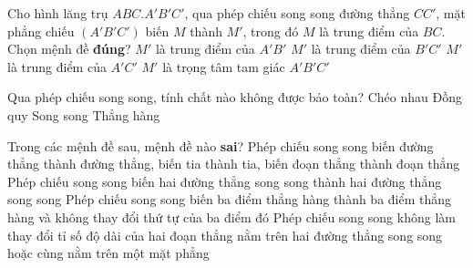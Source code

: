 

\begin{ex}%
	Cho hình lăng trụ $ABC.A'B'C'$, qua phép chiếu song song đường thẳng $CC'$, mặt phẳng  chiếu $(A'B'C')$ biến $M$ thành $M'$, trong đó $M$ là trung điểm của $BC$. Chọn mệnh đề \textbf{đúng}?
	\choice 
		{$M'$ là trung điểm của  $A'B'$}
		{\True $M'$ là trung điểm của  $B'C'$}
		{$M'$ là trung  điểm của $A'C'$}
		{$M'$ là  trọng tâm tam giác $A'B'C'$}
\end{ex}

\begin{ex}%
	Qua phép chiếu song song, tính chất nào không  được bảo toàn?
	\choice 
		{\True Chéo nhau} 
		{Đồng quy} 
		{Song song} 
		 {Thẳng hàng}
\end{ex}

\begin{ex}%
	Trong các mệnh đề sau, mệnh đề nào \textbf{sai}? 
	\choice 
		{Phép chiếu song song biến đường thẳng thành đường thẳng, biến tia thành tia,  biến đoạn thẳng thành đoạn thẳng}
		{\True Phép chiếu song song biến  hai đường thẳng song song thành hai đường thẳng song song}
		{Phép chiếu song song biến ba điểm thẳng hàng  thành ba điểm thẳng hàng và không thay đổi thứ tự của ba điểm đó}
		{Phép chiếu song song không làm thay đổi tỉ số độ dài của hai đoạn thẳng  nằm trên hai đường thẳng song song hoặc cùng nằm trên một mặt phẳng}
\end{ex}

